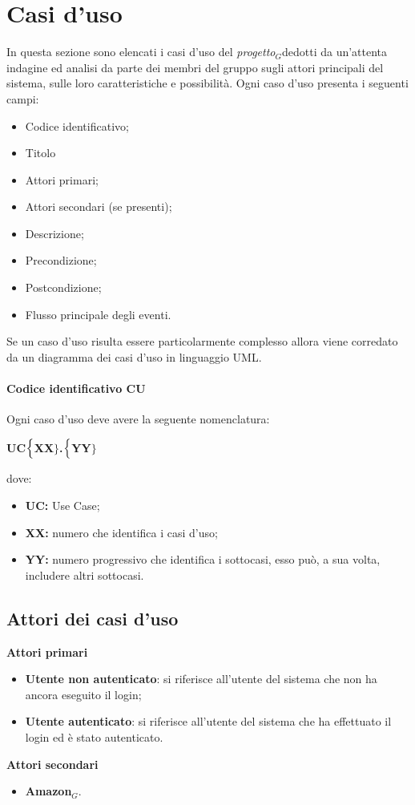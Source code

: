 \chapter{Casi d'uso}
In questa sezione sono elencati i casi d'uso del \textit{progetto$_{G}$}dedotti da un'attenta indagine ed analisi da parte dei membri del gruppo sugli attori principali del sistema, sulle loro caratteristiche e possibilità.
Ogni caso d'uso presenta i seguenti campi:
\begin{itemize}
	\item Codice identificativo;
	\item Titolo
	\item Attori primari;
	\item Attori secondari (se presenti);
	\item Descrizione;
	\item Precondizione;
	\item Postcondizione;
	\item Flusso principale degli eventi.
\end{itemize}
Se un caso d'uso risulta essere particolarmente complesso allora viene corredato da un diagramma dei casi d'uso in linguaggio UML.
\subsubsection{Codice identificativo CU}
Ogni caso d'uso deve avere la seguente nomenclatura:
\begin{center}
	\textbf{UC$\Bigl\{$XX$\Bigr\}$.$\Bigl\{$YY$\Bigr\}$}
\end{center}
dove:
\begin{itemize}
	\item \textbf{UC:} Use Case;
	\item \textbf{{XX}:} numero che identifica i casi d'uso;
	\item \textbf{{YY}:} numero progressivo che identifica i sottocasi, esso può, a sua volta, includere altri sottocasi.
\end{itemize}

\section{Attori dei casi d'uso}
\textbf{Attori primari}
\begin{itemize}
	\item \textbf{Utente non autenticato}: si riferisce all'utente del sistema che non ha ancora eseguito il login;
	\item \textbf{Utente autenticato}: si riferisce all'utente del sistema che ha effettuato il login ed è stato autenticato.
\end{itemize}
\textbf{Attori secondari}
\begin{itemize}
	\item \textbf{Amazon$_{G}$}.
\end{itemize}

